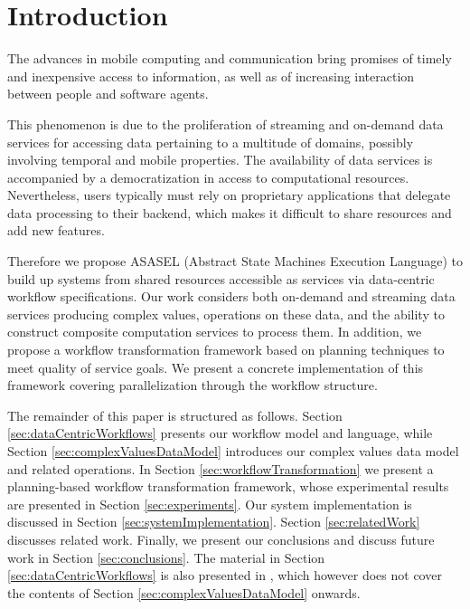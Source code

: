 	
\section{Introduction}\label{sec:asasel:intro}

The advances in mobile computing and communication bring promises of timely and inexpensive access to information, as well as of increasing interaction between people and software agents. 

This phenomenon is due to the proliferation of streaming and on-demand data services for accessing data pertaining to a multitude of domains,  possibly involving temporal and mobile properties. The availability of data services is accompanied by a democratization in access to computational resources. Nevertheless, users typically must rely on proprietary applications that delegate data processing to their backend, which makes it difficult to share resources and add new features.	
	
Therefore we propose ASASEL (Abstract State Machines Execution Language) to build up systems from shared resources accessible as services via data-centric workflow specifications. Our work considers both on-demand and streaming data services producing complex values, operations on these data, and the ability to construct composite computation services to process them. In addition, we propose a workflow transformation framework 
based on planning techniques to meet quality of service goals. We present a concrete implementation of this framework covering parallelization through the workflow structure.

The remainder of this paper is structured as follows. Section \ref{sec:dataCentricWorkflows} presents our workflow model and language, while Section \ref{sec:complexValuesDataModel} introduces our complex values data model and related operations. In Section \ref{sec:workflowTransformation} we present a planning-based workflow transformation framework, whose experimental results are presented in Section \ref{sec:experiments}. Our system implementation is discussed in Section \ref{sec:systemImplementation}. Section \ref{sec:relatedWork} discusses related work. Finally, we present our conclusions and discuss future work in Section \ref{sec:conclusions}. The material in Section \ref{sec:dataCentricWorkflows} is also presented in \cite{Cuevas-Vicenttin:2010:CSA:1947725.1947753}, which however does not cover the contents of Section \ref{sec:complexValuesDataModel} onwards.

 


